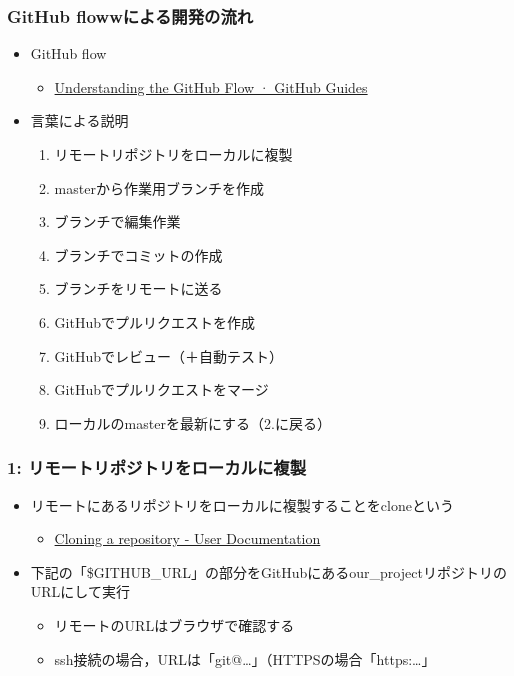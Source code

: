 \documentclass[a4paper,twoside,twocolumn]{bxjsarticle}
\begin{document}
\subsubsection{GitHub flowwによる開発の流れ}
\label{sec-2-3-1}
\begin{itemize}
\item GitHub flow
\begin{itemize}
\item \href{https://guides.github.com/introduction/flow/}{Understanding the GitHub Flow · GitHub Guides}
\end{itemize}
\item 言葉による説明
\begin{enumerate}
\item リモートリポジトリをローカルに複製
\item masterから作業用ブランチを作成
\item ブランチで編集作業
\item ブランチでコミットの作成
\item ブランチをリモートに送る
\item GitHubでプルリクエストを作成
\item GitHubでレビュー（＋自動テスト）
\item GitHubでプルリクエストをマージ
\item ローカルのmasterを最新にする（2.に戻る）
\end{enumerate}
\end{itemize}

\subsubsection{1: リモートリポジトリをローカルに複製}
\label{sec-2-3-2}
\begin{itemize}
\item リモートにあるリポジトリをローカルに複製することをcloneという
\begin{itemize}
\item \href{https://help.github.com/articles/cloning-a-repository/}{Cloning a repository - User Documentation}
\end{itemize}
\item 下記の「\$GITHUB\_URL」の部分をGitHubにあるour\_projectリポジトリのURLにして実行
\begin{itemize}
\item リモートのURLはブラウザで確認する
\item ssh接続の場合，URLは「git@\ldots{}」（HTTPSの場合「https:\ldots{}」
\end{itemize}
\end{itemize}
\end{document}
